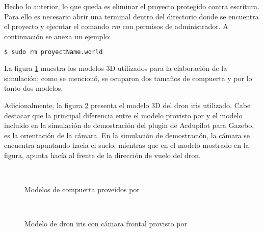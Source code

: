 Hecho lo anterior, lo que queda es eliminar el proyecto protegido contra escritura. Para ello es necesario abrir una terminal dentro del directorio donde se encuentra el proyecto y ejecutar el comando \textit{rm} con permisos de administrador. A continuación se anexa un ejemplo:

\begin{lstlisting}[language = bash]
    $ sudo rm proyectName.world
\end{lstlisting} 

La figura \ref{fig:Gazebo_gates} muestra los modelos 3D utilizados para la elaboración de la simulación; como se mencionó, se ocuparon dos tamaños de compuerta y por lo tanto dos modelos.

Adicionalmente, la figura \ref{fig:Gazebo_iris} presenta el modelo 3D del dron iris utilizado. Cabe destacar que la principal diferencia entre el modelo provisto por \cite{IQ} y el modelo incluido en la simulación de demostración del plugin de Ardupilot para Gazebo, es la orientación de la cámara. En la simulación de demostración, la cámara se encuentra apuntando hacia el suelo, mientras que en el modelo mostrado en la figura, apunta hacía al frente de la dirección de vuelo del dron.

\begin{figure}[ht]
    \centering
    \hfill
    \\
    \hfill
    \caption{Modelos de compuerta proveídos por \cite{rojas2020deeppilot}}
    \label{fig:Gazebo_gates}
\end{figure}

\begin{figure}[ht]
    \centering
    \hfill
    \\
    \hfill

    \caption{Modelo de dron iris con cámara frontal provisto por \citet{IQ}}
    \label{fig:Gazebo_iris}
\end{figure}


